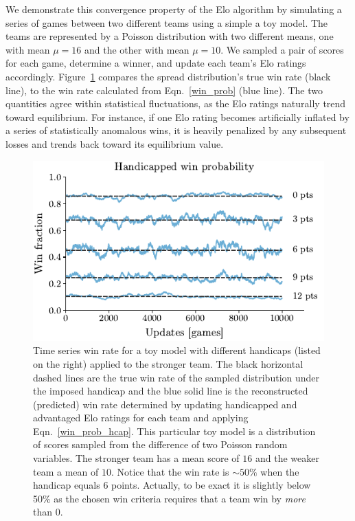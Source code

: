\documentclass[aps,prc,reprint,amsmath,superscriptaddress]{revtex4-1}
\begin{document}
We demonstrate this convergence property of the Elo algorithm by simulating a series of games between two different teams using a simple a toy model.
The teams are represented by a Poisson distribution with two different means, one with mean $\mu=16$ and the other with mean $\mu=10$.
We sampled a pair of scores for each game, determine a winner, and update each team's Elo ratings accordingly.
Figure~\ref{fig:win_rate} compares the spread distribution's true win rate (black line), to the win rate calculated from Eqn.~\eqref{win_prob} (blue line).
The two quantities agree within statistical fluctuations, as the Elo ratings naturally trend toward equilibrium.
For instance, if one Elo rating becomes artificially inflated by a series of statistically anomalous wins, it is heavily penalized by any subsequent losses and trends back toward its equilibrium value.
\begin{figure}
  \includegraphics{win_rate}
  \caption{\label{fig:win_rate} Time series win rate for a toy model with different handicaps (listed on the right) applied to the stronger team. The black horizontal dashed lines are the true win rate of the sampled distribution under the imposed handicap and the blue solid line is the reconstructed (predicted) win rate determined by updating handicapped and advantaged Elo ratings for each team and applying Eqn.~\eqref{win_prob_hcap}. This particular toy model is a distribution of scores sampled from the difference of two Poisson random variables. The stronger team has a mean score of $16$ and the weaker team a mean of $10$. Notice that the win rate is $\sim\!50\%$ when the handicap equals $6$ points. Actually, to be exact it is slightly below 50\% as the chosen win criteria requires that a team win by \emph{more} than 0.}
\end{figure}
\end{document}
